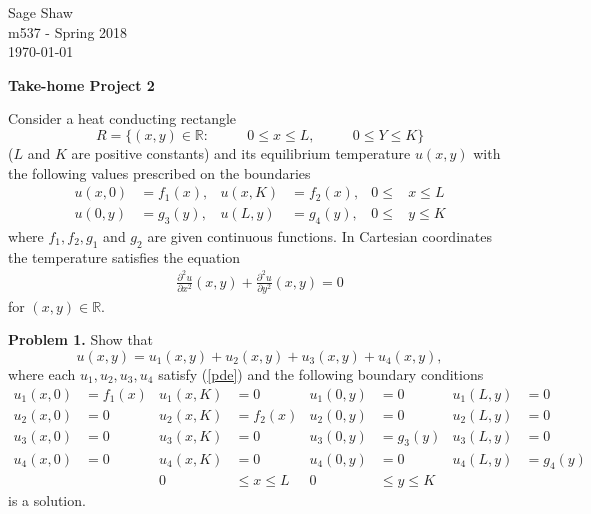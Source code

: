 \documentclass[12pt]{article}
\newcommand{\problem}[1]{\hspace{-4 ex} \large \textbf{Problem #1} }
\newcommand{\RR}{\mathbb{R}}
\begin{document}
	\thispagestyle{empty}
	
	\begin{flushright}
		Sage Shaw \\
		m537 - Spring 2018 \\
		\today
	\end{flushright}
	
{\large \textbf{Take-home Project 2}}\bigbreak

Consider a heat conducting rectangle 
$$
	R = \{(x,y) \in \RR: \phantom{==} 0 \leq x \leq L, \phantom{==} 0 \leq Y \leq K \}
$$
($L$ and $K$ are positive constants) and its equilibrium temperature $u(x,y)$ with the following values prescribed on the boundaries
\begin{align*}
u(x,0) & = f_1(x), & u(x,K) & = f_2(x), & 0 \leq & x \leq L \\
u(0,y) & = g_3(y), & u(L,y) & = g_4(y), & 0 \leq & y \leq K 
\end{align*}
where $f_1,f_2, g_1$ and $g_2$ are given continuous functions. In Cartesian coordinates the temperature satisfies the equation
\begin{align}
	\frac{\partial^2 u}{\partial x^2}(x,y) + \frac{\partial^2 u}{\partial y^2}(x,y) = 0 \label{pde}
\end{align}
for $(x,y) \in \RR$. 

\problem{1. } Show that 
$$
u(x,y) = u_1(x,y) + u_2(x,y) + u_3(x,y) + u_4(x,y),
$$
where each $u_1, u_2, u_3, u_4$ satisfy (\ref{pde}) and the following boundary conditions
\begin{align*}
	u_1(x,0) & = f_1(x) &  u_1(x,K) & = 0 & u_1(0,y) &= 0 & u_1(L,y)&= 0 \\
	u_2(x,0) & = 0 &  u_2(x,K) & = f_2(x) & u_2(0,y) &= 0 & u_2(L,y)&= 0 \\
	u_3(x,0) & = 0 &  u_3(x,K) & = 0 & u_3(0,y) &= g_3(y) & u_3(L,y)&= 0 \\
	u_4(x,0) & = 0 &  u_4(x,K) & = 0 & u_4(0,y) &= 0 & u_4(L,y)&=  g_4(y) \\
	&& 0 & \leq x \leq L &  0 & \leq y \leq K &&
\end{align*}
is a solution. \bigbreak
\end{document}
